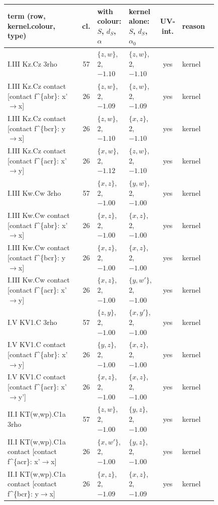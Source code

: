 \documentclass[9pt]{article}
\numberwithin{equation}{section}
\begin{document}
{\scriptsize
\begin{center}
\renewcommand{\arraystretch}{1.1}\setlength{\tabcolsep}{2pt}
\begin{tabular}{|p{0.36\linewidth}|c|p{0.15\linewidth}|p{0.15\linewidth}|c|p{0.17\linewidth}|}\hline
term (row, kernel.colour, type) & cl. & with colour: $S$, $d_S$, $\alpha$ & kernel alone: $S$, $d_S$, $\alpha_0$ & UV-int. & reason\\\hline
I.III Kz.Cz 3rho & 57 & $\{z,w\}$, 2, $-1.10$ & $\{z,w\}$, 2, $-1.10$ & yes & kernel\\
I.III Kz.Cz contact [contact f\^{}\{abr\}: x'$\to$x] & 26 & $\{z,w\}$, 2, $-1.09$ & $\{z,w\}$, 2, $-1.09$ & yes & kernel\\
I.III Kz.Cz contact [contact f\^{}\{bcr\}: y$\to$x] & 26 & $\{z,w\}$, 2, $-1.10$ & $\{x,z\}$, 2, $-1.10$ & yes & kernel\\
I.III Kz.Cz contact [contact f\^{}\{acr\}: x'$\to$y] & 26 & $\{x,w\}$, 2, $-1.12$ & $\{z,w\}$, 2, $-1.10$ & yes & kernel\\
I.III Kw.Cw 3rho & 57 & $\{x,z\}$, 2, $-1.00$ & $\{y,w\}$, 2, $-1.00$ & yes & kernel\\
I.III Kw.Cw contact [contact f\^{}\{abr\}: x'$\to$x] & 26 & $\{x,z\}$, 2, $-1.00$ & $\{x,z\}$, 2, $-1.00$ & yes & kernel\\
I.III Kw.Cw contact [contact f\^{}\{bcr\}: y$\to$x] & 26 & $\{x,z\}$, 2, $-1.00$ & $\{x,z\}$, 2, $-1.00$ & yes & kernel\\
I.III Kw.Cw contact [contact f\^{}\{acr\}: x'$\to$y] & 26 & $\{x,z\}$, 2, $-1.00$ & $\{y,w'\}$, 2, $-1.00$ & yes & kernel\\
I.V KV1.C 3rho & 57 & $\{z,y\}$, 2, $-1.00$ & $\{x,y'\}$, 2, $-1.00$ & yes & kernel\\
I.V KV1.C contact [contact f\^{}\{abr\}: x'$\to$y] & 26 & $\{y,z\}$, 2, $-1.00$ & $\{x,z\}$, 2, $-1.00$ & yes & kernel\\
I.V KV1.C contact [contact f\^{}\{acr\}: x'$\to$y'] & 26 & $\{x,z\}$, 2, $-1.00$ & $\{x,z\}$, 2, $-1.00$ & yes & kernel\\
II.I KT(w,wp).C1a 3rho & 57 & $\{z,w\}$, 2, $-1.00$ & $\{y,z\}$, 2, $-1.00$ & yes & kernel\\
II.I KT(w,wp).C1a contact [contact f\^{}\{acr\}: x'$\to$x] & 26 & $\{x,w'\}$, 2, $-1.00$ & $\{y,z\}$, 2, $-1.00$ & yes & kernel\\
II.I KT(w,wp).C1a contact [contact f\^{}\{bcr\}: y$\to$x] & 26 & $\{x,z\}$, 2, $-1.09$ & $\{x,z\}$, 2, $-1.09$ & yes & kernel\\

\end{tabular}
\end{center}}
\end{document}
